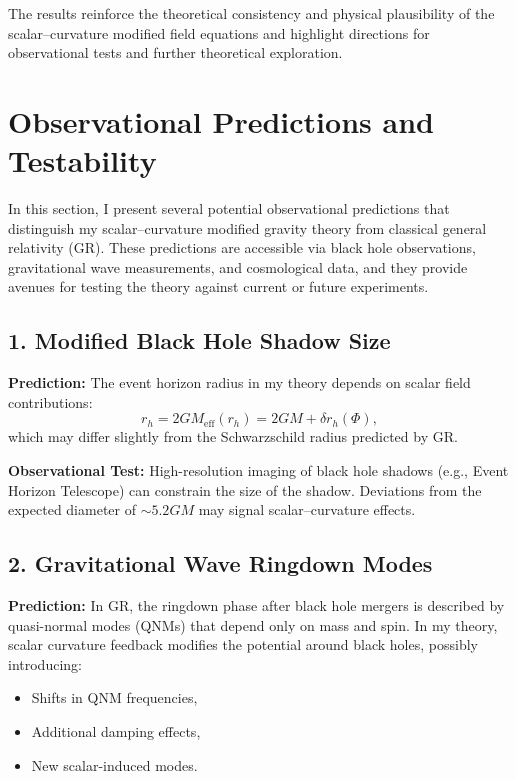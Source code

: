 \documentclass[12pt]{article}
\begin{document}
The results reinforce the theoretical consistency and physical plausibility of the scalar--curvature modified field equations and highlight directions for observational tests and further theoretical exploration.

\section{Observational Predictions and Testability}

In this section, I present several potential observational predictions that distinguish my scalar--curvature modified gravity theory from classical general relativity (GR). These predictions are accessible via black hole observations, gravitational wave measurements, and cosmological data, and they provide avenues for testing the theory against current or future experiments.

\subsection{1. Modified Black Hole Shadow Size}

\textbf{Prediction:}  
The event horizon radius in my theory depends on scalar field contributions:
\[
r_h = 2G M_{\text{eff}}(r_h) = 2GM + \delta r_h(\Phi),
\]
which may differ slightly from the Schwarzschild radius predicted by GR.

\textbf{Observational Test:}  
High-resolution imaging of black hole shadows (e.g., Event Horizon Telescope) can constrain the size of the shadow. Deviations from the expected diameter of \( \sim 5.2 GM \) may signal scalar–curvature effects.

\subsection{2. Gravitational Wave Ringdown Modes}

\textbf{Prediction:}  
In GR, the ringdown phase after black hole mergers is described by quasi-normal modes (QNMs) that depend only on mass and spin. In my theory, scalar curvature feedback modifies the potential around black holes, possibly introducing:
\begin{itemize}
    \item Shifts in QNM frequencies,
    \item Additional damping effects,
    \item New scalar-induced modes.
\end{itemize}
\end{document}
